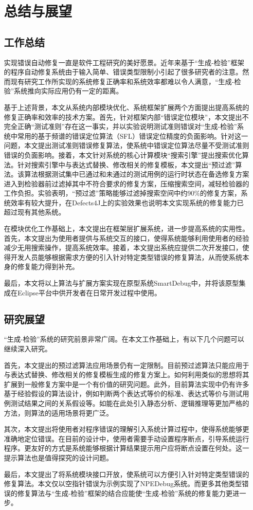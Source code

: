 \chapter{总结与展望}
\label{cha:sum}

\section{工作总结}%
实现错误自动修复一直是软件工程研究的美好愿景。近年来基于“生成-检验”框架的程序自动修复系统由于输入简单、错误类型限制小引起了很多研究者的注意。然而现有研究工作所实现的系统修复正确率和系统效率都难以令人满意，“生成-检验”系统推向实际应用仍有一定的距离。

基于上述背景，本文从系统内部模块优化、系统框架扩展两个方面提出提高系统的修复正确率和效率的技术方案。首先，针对框架内部“错误定位模块”，本文提出不完全正确“测试准则”存在这一事实，并以实验说明测试准则错误对“生成-检验”系统中常用的基于频谱的错误定位算法（SFL）错误定位精度的负面影响。针对这一问题，本文提出测试准则错误修复算法，使系统中错误定位算法尽量不受测试准则错误的负面影响。接着，本文针对系统的核心计算模块“搜索引擎”提出搜索优化算法。针对搜索引擎中与表达式替换、修改相关的修复模板，本文提出“预过滤”算法。该算法根据测试集中已通过和未通过的测试用例的运行时状态在备选修复方案进入到检验器前过滤掉其中不符合要求的修复方案，压缩搜索空间，减轻检验器的工作负担。实验表明，“预过滤”策略能够过滤掉搜索空间中约90\%的修复方案，系统效率有较大提升，在Defects4J上的实验效果也说明本文实现系统的修复能力已超过现有其他系统。

在模块优化工作基础上，本文提出在框架层扩展系统，进一步提高系统的实用性。首先，本文提出为使用者提供与系统交互的接口，使得系统能够利用使用者的经验减少无用搜索操作，提高系统效率。接着，本文提出系统应提供二次开发接口，使得开发人员能够根据需求方便的引入针对特定类型错误的修复算法，从而使系统本身的修复能力得到补充。

最后，本文将以上算法与扩展方案实现在原型系统SmartDebug中，并将该原型集成在Eclipse平台中供开发者在日常开发过程中使用。

\section{研究展望}

“生成-检验”系统的研究前景非常广阔。在本文工作基础上，有以下几个问题可以继续深入研究。

首先，本文提出的预过滤算法应用场景仍有一定限制。目前预过滤算法只能应用于与表达式替换、修改相关的修复模板生成的修复方案上。如何利用类似的思想将其扩展到一般修复方案中是一个有价值的研究问题。此外，目前算法实现中仍有许多基于经验假设的算法设计，例如判断两个表达式等价的标准、表达式等价与测试用例测试结果之间的关系假设等。如能在此处引入静态分析、逻辑推理等更加严格的方法，则算法的适用场景将更广泛。

其次，本文提出将使用者对程序错误的理解引入系统计算过程中，使得系统能够更准确地定位错误。在目前的设计中，使用者需要手动设置程序断点，引导系统运行程序。更友好的方式是系统能够根据计算结果提示用户应将断点设置在何处。这一提示算法也是值得探究的设计问题。

最后，本文提出了将系统模块接口开放，使系统可以方便引入针对特定类型错误的修复算法。本文仅以空指针错误为示例实现了NPEDebug系统。而更多其他类型错误的修复算法与“生成-检验”框架的结合应能使“生成-检验”系统的修复能力更进一步。